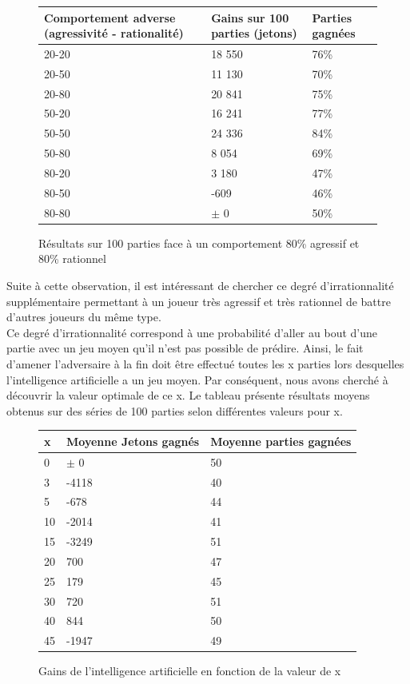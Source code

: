 \documentclass{report}
\begin{document}
\begin{figure}[H]
\hspace{-2cm}
\begin{tabular}{|l|l|l|}
\hline
Comportement adverse (agressivité - rationalité) & Gains sur 100 parties (jetons) &	Parties gagnées \\
\hline
20-20	 & 18 550 &	76\% \\
\hline
20-50 	&	11 130 &	 70\%\\
\hline
20-80 & 20 841 &	75\% \\
\hline
50-20 &	16 241 &	 77\% \\
\hline
50-50 &	24 336 &	 84\% \\
\hline
50-80 &	8 054 &  69\% \\
\hline
80-20 &	3 180 &	47\% \\
\hline
80-50 & 	-609 &	46\% \\
\hline
80-80 & $\pm$ 0  & 50\% \\
\hline
\end{tabular}

\caption{Résultats sur 100 parties face à un comportement 80\% agressif et 80\% rationnel}
\end{figure}

Suite à cette observation, il est intéressant de chercher ce degré d'irrationnalité supplémentaire permettant à un joueur très agressif et très rationnel de battre d'autres joueurs du même type.\\
 
Ce degré d'irrationnalité correspond à une probabilité d'aller au bout d'une partie avec un jeu moyen qu'il n'est pas possible de prédire. Ainsi, le fait d'amener l'adversaire à la fin doit être effectué toutes les x parties lors desquelles l'intelligence artificielle a un jeu moyen. Par conséquent, nous avons cherché à découvrir la valeur optimale de ce x. Le tableau présente résultats moyens obtenus sur des séries de 100 parties selon différentes valeurs pour x. \\ 

\begin{figure}[H]
\begin{center}
\begin{tabular}{|l|l|l|}
\hline
x &	Moyenne Jetons gagnés &	Moyenne parties gagnées \\
\hline
0 &	$\pm$ 0	&	50 \\
\hline
3 &	-4118 &	40\\
\hline
5	&-678&	44\\
\hline
10&	-2014	&41\\
\hline
15&	-3249&	51\\
\hline
20&	700	&47\\
\hline
25&	179&	45\\
\hline
30&	720 &	51\\
\hline
40 &	844	& 50\\
\hline
45 &	-1947 &	49\\
\hline
\end{tabular}
\caption{Gains de l'intelligence artificielle en fonction de la valeur de x}
\end{center}
\end{figure}
\end{document}
